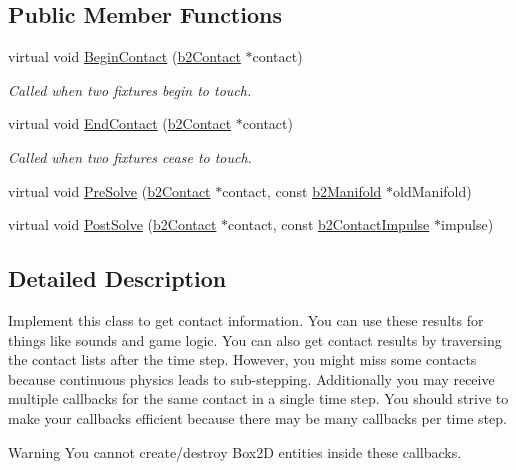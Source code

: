 \subsection*{Public Member Functions}
\begin{DoxyCompactItemize}
\item 
\hypertarget{classb2_contact_listener_a35148fc56fb9eac12077200fbd928f65}{virtual void \hyperlink{classb2_contact_listener_a35148fc56fb9eac12077200fbd928f65}{Begin\-Contact} (\hyperlink{classb2_contact}{b2\-Contact} $\ast$contact)}\label{classb2_contact_listener_a35148fc56fb9eac12077200fbd928f65}

\begin{DoxyCompactList}\small\item\em Called when two fixtures begin to touch. \end{DoxyCompactList}\item 
\hypertarget{classb2_contact_listener_afb3059058e5c47903a3947c2eef5826b}{virtual void \hyperlink{classb2_contact_listener_afb3059058e5c47903a3947c2eef5826b}{End\-Contact} (\hyperlink{classb2_contact}{b2\-Contact} $\ast$contact)}\label{classb2_contact_listener_afb3059058e5c47903a3947c2eef5826b}

\begin{DoxyCompactList}\small\item\em Called when two fixtures cease to touch. \end{DoxyCompactList}\item 
virtual void \hyperlink{classb2_contact_listener_a416f85eb45a1099053402b15a19a7de0}{Pre\-Solve} (\hyperlink{classb2_contact}{b2\-Contact} $\ast$contact, const \hyperlink{structb2_manifold}{b2\-Manifold} $\ast$old\-Manifold)
\item 
virtual void \hyperlink{classb2_contact_listener_acd58ec96f7569b95eec65b8ca3f8013d}{Post\-Solve} (\hyperlink{classb2_contact}{b2\-Contact} $\ast$contact, const \hyperlink{structb2_contact_impulse}{b2\-Contact\-Impulse} $\ast$impulse)
\end{DoxyCompactItemize}


\subsection{Detailed Description}
Implement this class to get contact information. You can use these results for things like sounds and game logic. You can also get contact results by traversing the contact lists after the time step. However, you might miss some contacts because continuous physics leads to sub-\/stepping. Additionally you may receive multiple callbacks for the same contact in a single time step. You should strive to make your callbacks efficient because there may be many callbacks per time step. \begin{DoxyWarning}{Warning}
You cannot create/destroy Box2\-D entities inside these callbacks. 
\end{DoxyWarning}


